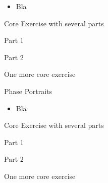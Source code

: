 \begin{lesson}

	\begin{itemize}
		\item Bla
	\end{itemize}
	

\end{lesson}




\newpage

\question
	Core Exercise with several parts
\begin{parts}
	\item Part 1
	\item Part 2
\end{parts}


\bookonlynewpage


\question
	One more core exercise




%
%



\begin{module}{Phase Portraits}
	\label{sys:phase}

	
	
\end{module}



\begin{lesson}

	\begin{itemize}
		\item Bla
	\end{itemize}
	

\end{lesson}




\newpage

\question
	Core Exercise with several parts
\begin{parts}
	\item Part 1
	\item Part 2
\end{parts}


\bookonlynewpage


\question
	One more core exercise



